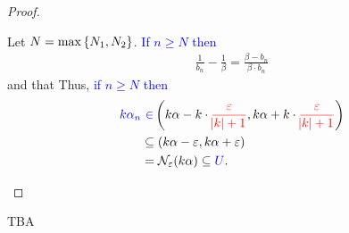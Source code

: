 \documentclass[11pt,openany]{article}
\begin{document}
\begin{note}[]
\begin{proof}
\begin{flushleft}
\begin{minipage}[t]{0.49\textwidth}
\begin{enumerate}[(4)]
\[\] Let \textcolor{blue}{$N=\max\set{N_1,N_2}$}. \textcolor{blue}{If $n\geq N$ then}
\begin{align*}
\frac{1}{b_n}-\frac{1}{\beta}=\frac{\beta-b_n}{\beta\cdot b_n}
\end{align*}
and that Thus, \textcolor{blue}{if $n\geq N$ then} \begin{align*}
	\textcolor{blue}{k\alpha_n}&\ \textcolor{blue}{\in}\intoo{k\alpha-k\cdot\textcolor{red}{\frac{\varepsilon}{\abs{k}+1}},k\alpha+k\cdot\textcolor{red}{\frac{\varepsilon}{\abs{k}+1}}}\\
	&\subseteq\intoo{k\alpha-\varepsilon,k\alpha+\varepsilon}\\
	&=\nbhd_\varepsilon(k\alpha)\subseteq\textcolor{blue}{U}.
\end{align*}
\end{enumerate}
\end{minipage}
\end{flushleft}
\end{proof}
\end{note}
\begin{note}
	TBA
\end{note}
\vfill
\end{document}
